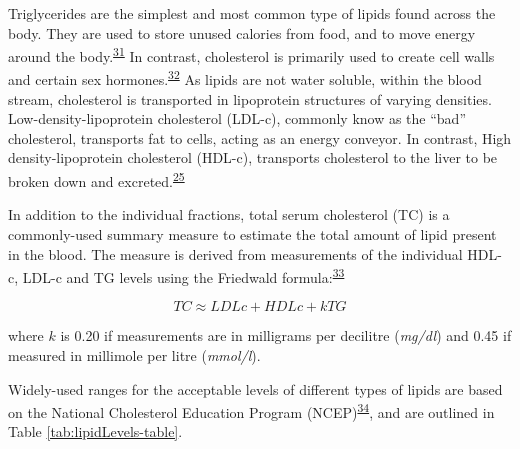 \documentclass[a4paper, twoside]{templates/ociamthesis}
\begin{document}
Triglycerides are the simplest and most common type of lipids found across the body. They are used to store unused calories from food, and to move energy around the body.\textsuperscript{\protect\hyperlink{ref-laufs2020}{31}} In contrast, cholesterol is primarily used to create cell walls and certain sex hormones.\textsuperscript{\protect\hyperlink{ref-zampelas2019}{32}} As lipids are not water soluble, within the blood stream, cholesterol is transported in lipoprotein structures of varying densities. Low-density-lipoprotein cholesterol (LDL-c), commonly know as the ``bad'' cholesterol, transports fat to cells, acting as an energy conveyor. In contrast, High density-lipoprotein cholesterol (HDL-c), transports cholesterol to the liver to be broken down and excreted.\textsuperscript{\protect\hyperlink{ref-feingold2000}{25}}

In addition to the individual fractions, total serum cholesterol (TC) is a commonly-used summary measure to estimate the total amount of lipid present in the blood. The measure is derived from measurements of the individual HDL-c, LDL-c and TG levels using the Friedwald formula:\textsuperscript{\protect\hyperlink{ref-friedewald1972}{33}}

\begin{equation}
  TC \approx LDLc + HDLc + kTG
  \label{eq:total-cholesterol-formula}
\end{equation}

where \(k\) is 0.20 if measurements are in milligrams per decilitre (\emph{mg/dl}) and 0.45 if measured in millimole per litre (\emph{mmol/l}).

Widely-used ranges for the acceptable levels of different types of lipids are based on the National Cholesterol Education Program (NCEP)\textsuperscript{\protect\hyperlink{ref-national2002third}{34}}, and are outlined in Table \ref{tab:lipidLevels-table}.

~
\end{document}
